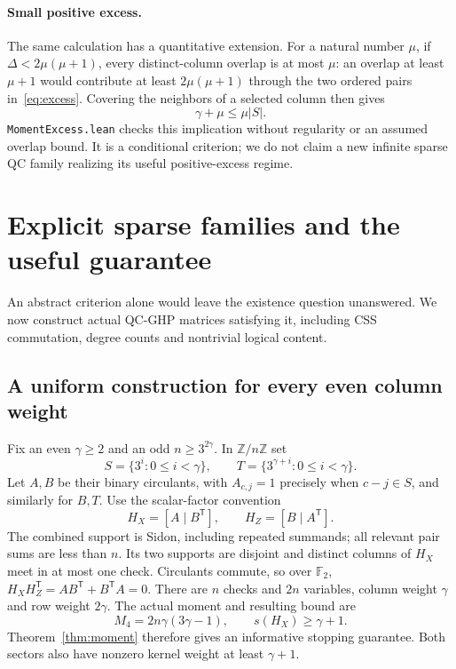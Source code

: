 \documentclass[11pt]{article}
\begin{document}
\paragraph{Small positive excess.}
The same calculation has a quantitative extension. For a natural number $\mu$,
if $\Delta<2\mu(\mu+1)$, every distinct-column overlap is at most $\mu$:
an overlap at least $\mu+1$ would contribute at least $2\mu(\mu+1)$ through
the two ordered pairs in~\eqref{eq:excess}. Covering the neighbors of a selected
column then gives
\[
 \gamma+\mu\le\mu|S|.
\]
\texttt{MomentExcess.lean} checks this implication without regularity or an
assumed overlap bound. It is a conditional criterion; we do not claim a new
infinite sparse QC family realizing its useful positive-excess regime.

\section{Explicit sparse families and the useful guarantee}
\label{sec:families}
An abstract criterion alone would leave the existence question unanswered.
We now construct actual QC-GHP matrices satisfying it, including CSS
commutation, degree counts and nontrivial logical content.

\subsection{A uniform construction for every even column weight}
Fix an even $\gamma\ge2$ and an odd $n\ge3^{2\gamma}$. In $\mathbb Z/n\mathbb Z$ set
\[
 S=\{3^i:0\le i<\gamma\},\qquad
 T=\{3^{\gamma+i}:0\le i<\gamma\}.
\]
Let $A,B$ be their binary circulants, with $A_{c,j}=1$ precisely when
$c-j\in S$, and similarly for $B,T$. Use the scalar-factor convention
\begin{equation}\label{eq:joint}
 H_X=[A\mid B^{\mathsf T}],\qquad H_Z=[B\mid A^{\mathsf T}].
\end{equation}
The combined support is Sidon, including repeated summands; all relevant pair
sums are less than $n$. Its two supports are disjoint and distinct columns of
$H_X$ meet in at most one check. Circulants commute, so over $\mathbb F_2$,
$H_XH_Z^{\mathsf T}=AB^{\mathsf T}+B^{\mathsf T}A=0$.
There are $n$ checks and $2n$ variables, column weight $\gamma$ and row weight
$2\gamma$. The actual moment and resulting bound are
\[
 M_4=2n\gamma(3\gamma-1),\qquad s(H_X)\ge\gamma+1.
\]
Theorem~\ref{thm:moment} therefore gives an informative stopping guarantee.
Both sectors also have nonzero kernel weight at least $\gamma+1$.
\end{document}
